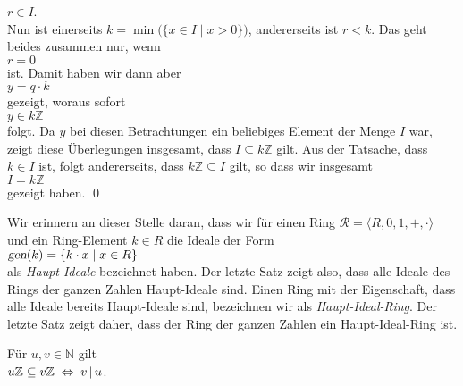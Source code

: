 \begin{enumerate}
      $r \in I$.
      \\[0.2cm]
      Nun ist einerseits $k = \min\bigl(\{x \in I \mid x > 0 \}\bigr)$, andererseits ist $r < k$.
      Das geht beides zusammen nur, wenn
      \\[0.2cm]
      \hspace*{1.3cm}
      $r = 0$
      \\[0.2cm]
      ist.  Damit haben wir dann aber
      \\[0.2cm]
      \hspace*{1.3cm}
      $y = q \cdot k$
      \\[0.2cm]
      gezeigt, woraus sofort
      \\[0.2cm]
      \hspace*{1.3cm}
      $y \in k\mathbb{Z}$
      \\[0.2cm]
      folgt.  Da $y$ bei diesen Betrachtungen ein beliebiges Element der Menge $I$ war,
      zeigt diese Überlegungen insgesamt, dass $I \subseteq k\mathbb{Z}$ gilt.  Aus der
      Tatsache, dass $k \in I$ ist, folgt andererseits, dass $k\mathbb{Z} \subseteq I$
      gilt, so dass wir insgesamt
      \\[0.2cm]
      \hspace*{1.3cm}
      $I = k\mathbb{Z}$
      \\[0.2cm]
      gezeigt haben.  \qed
\end{enumerate}

\remark
Wir erinnern an dieser Stelle daran, dass wir für einen Ring 
$\mathcal{R} = \langle R, 0, 1, +, \cdot \rangle$ und ein
Ring-Element $k \in R$ die Ideale der Form
\\[0.2cm]
\hspace*{1.3cm}
$\textsl{gen}(k) = \{ k \cdot x \mid x \in R \}$
\\[0.2cm]
als \emph{Haupt-Ideale} bezeichnet haben.  Der letzte Satz zeigt also, dass alle Ideale des Rings
der ganzen Zahlen Haupt-Ideale sind.  Einen Ring mit der Eigenschaft, dass alle Ideale
bereits Haupt-Ideale sind, bezeichnen wir als \emph{Haupt-Ideal-Ring}.  Der letzte Satz
zeigt daher, dass der Ring der ganzen Zahlen ein Haupt-Ideal-Ring ist.

\begin{Lemma}
  Für $u,v \in \mathbb{N}$ gilt
  \\[0.2cm]
  \hspace*{1.3cm}
  $u\mathbb{Z} \subseteq v\mathbb{Z} \;\Leftrightarrow\; v \,|\, u$.
\end{Lemma}

